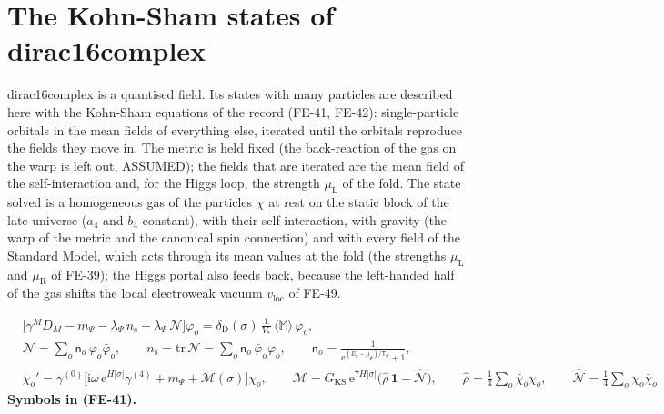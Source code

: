 \documentclass[
  10pt,
]{article}
\begin{document}
\hypertarget{the-kohn-sham-states-of-dirac16complex}{%
\section{The Kohn-Sham states of
dirac16complex}\label{the-kohn-sham-states-of-dirac16complex}}

dirac16complex is a quantised field. Its states with many particles are
described here with the Kohn-Sham equations of the record (FE-41,
FE-42): single-particle orbitals in the mean fields of everything else,
iterated until the orbitals reproduce the fields they move in. The
metric is held fixed (the back-reaction of the gas on the warp is left
out, ASSUMED); the fields that are iterated are the mean field of the
self-interaction and, for the Higgs loop, the strength
\(\mu_{\mathrm{L}}\) of the fold. The state solved is a homogeneous gas
of the particles \(\chi\) at rest on the static block of the late
universe (\(a_4\) and \(b_4\) constant), with their self-interaction,
with gravity (the warp of the metric and the canonical spin connection)
and with every field of the Standard Model, which acts through its mean
values at the fold (the strengths \(\mu_{\mathrm{L}}\) and
\(\mu_{\mathrm{R}}\) of FE-39); the Higgs portal also feeds back,
because the left-handed half of the gas shifts the local electroweak
vacuum \(v_{\mathrm{loc}}\) of FE-49.

\[
\begin{aligned}
&\big[\gamma^MD_M - m_\Psi - \lambda_\Psi\,n_{\mathrm{s}} + \lambda_\Psi\,\mathcal{N}\big]\varphi_o
 = \delta_{\mathrm{D}}(\sigma)\,\frac{1}{V_*}\,\langle\mathbb{M}\rangle\,\varphi_o,\\
&\mathcal{N} = \sum_o\mathsf{n}_o\,\varphi_o\bar\varphi_o,\qquad n_{\mathrm{s}} = \mathrm{tr}\,\mathcal{N} = \sum_o\mathsf{n}_o\,\bar\varphi_o\varphi_o,\qquad
 \mathsf{n}_o = \frac{1}{\mathrm{e}^{(E_o - \mu_\Psi)/\mathsf{T}_\Psi} + 1},\\
&\chi_o' = \gamma^{(0)}\Big[\mathrm{i}\omega\,\mathrm{e}^{H\lvert\sigma\rvert}\gamma^{(4)} + m_\Psi + \mathcal{M}(\sigma)\Big]\chi_o,\qquad
 \mathcal{M} = G_{\mathrm{KS}}\,\mathrm{e}^{7H\lvert\sigma\rvert}\big(\hat\rho\,\mathbf{1} - \hat{\mathcal{N}}\big),\qquad
 \hat\rho = \frac14\sum_o\bar\chi_o\chi_o,\qquad \hat{\mathcal{N}} = \frac14\sum_o\chi_o\bar\chi_o
\end{aligned} \tag{FE-41}
\] \textbf{Symbols in (FE-41).}
\end{document}
